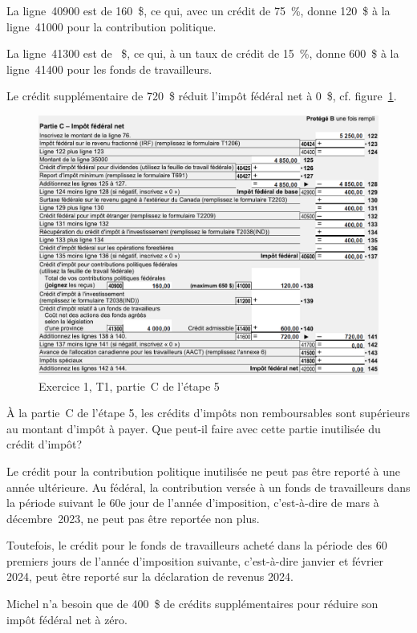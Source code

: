La ligne~40900 est de 160~\$, ce qui, avec un crédit de 75~\%, donne 120~\$ à la ligne~41000 pour la contribution politique.

La ligne~41300 est de ~\$, ce qui, à un taux de crédit de 15~\%, donne 600~\$ à la ligne~41400 pour les fonds de travailleurs.

Le crédit supplémentaire de 720~\$ réduit l'impôt fédéral net à 0~\$, cf. figure~\ref{fig:chap5Exercice1Q8T15C}.
\begin{figure}
	\centering
	\includegraphics[width=.9\textwidth]{exercice/5-1/Q8/T1-5C.png}
	\caption[]{Exercice 1, T1, partie~C de l'étape 5}
	\label{fig:chap5Exercice1Q8T15C}
\end{figure}

\begin{sousQuestion}
	À la partie~C de l'étape 5, les crédits d'impôts non remboursables sont supérieurs au montant d'impôt à payer. Que peut-il faire avec cette partie inutilisée du crédit d'impôt?
\end{sousQuestion}
Le crédit pour la contribution politique inutilisée ne peut pas être reporté à une année ultérieure. Au fédéral, la contribution versée à un fonds de travailleurs dans la période suivant le 60e jour de l'année d'imposition, c'est-à-dire de mars à décembre~2023, ne peut pas être reportée non plus.

Toutefois, le crédit pour le fonds de travailleurs acheté dans la période des 60 premiers jours de l'année d'imposition suivante, c'est-à-dire janvier et février 2024, peut être reporté sur la déclaration de revenus 2024.

Michel n'a besoin que de 400~\$ de crédits supplémentaires pour réduire son impôt fédéral net à zéro.

